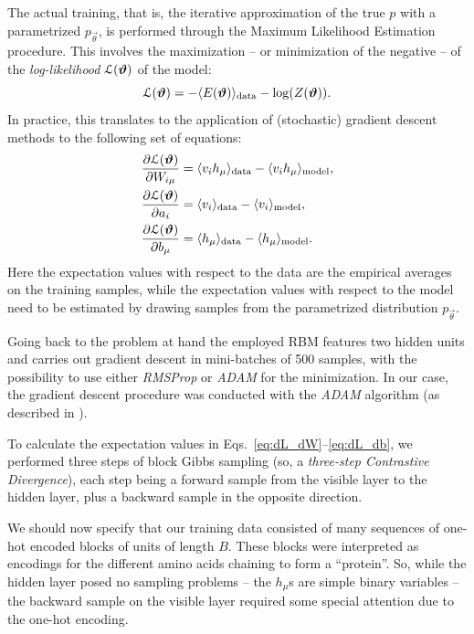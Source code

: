 \documentclass[prl, twocolumn]{revtex4-2}
\begin{document}
The actual training, that is, the iterative approximation of the true $p$
with a parametrized $p_{\vec{\theta}}$, is performed through the Maximum
Likelihood Estimation procedure. This involves the maximization – or
minimization of the negative – of the \emph{log-likelihood}
$\mathcal{L}(\bm{\vartheta})$ of the model:
\begin{equation}
    \mathcal{L}(\bm{\vartheta}) = -\langle E(\bm{\vartheta})\rangle_{\mathrm{data}} -
    \log(Z(\bm{\vartheta})).
\end{equation}
In practice, this translates to the application of (sto\-chas\-tic) gradient descent methods to the following set
of equations:
\begin{align}
    \pdiff{\logL(\vec{\theta})}{W_{i\mu}} &= \expval{v_i
    h_\mu}_{\mathrm{data}} - \expval{v_i h_\mu}_{\mathrm{model}},
    \label{eq:dL_dW} \\
    \pdiff{\logL(\vec{\theta})}{a_i} &= \expval{v_i}_{\mathrm{data}} -
    \expval{v_i}_{\mathrm{model}}, \label{eq:dL_da} \\
    \pdiff{\logL(\vec{\theta})}{b_\mu} &= \expval{h_\mu}_{\mathrm{data}} -
    \expval{h_\mu}_{\mathrm{model}}. \label{eq:dL_db}
\end{align}
Here the expectation values with respect to the data are the empirical
averages on the training samples, while the expectation values with respect
to the model need to be estimated by drawing samples from the parametrized
distribution $p_{\vec{\theta}}$.

Going back to the problem at hand the employed RBM features two hidden units and carries out gradient descent in mini-batches of 500 samples, with the possibility to use either \emph{RMSProp} or \emph{ADAM} for the minimization. In our case, the gradient descent procedure was conducted with the \emph{ADAM} algorithm (as described in
\cite{Mehta2019}). 

To calculate the expectation values in
Eqs.~\eqref{eq:dL_dW}–\eqref{eq:dL_db}, we performed three steps of block
Gibbs sampling (so, a \emph{three-step Contrastive Divergence}), each step
being a forward sample from the visible layer to the hidden layer, plus a
backward sample in the opposite direction.

We should now specify that our training data consisted of many sequences of
one-hot encoded blocks of units of length $B$. These blocks were interpreted as
encodings for the different amino acids chaining to form a “protein”. So,
while the hidden layer posed no sampling problems – the $h_\mu$s are
simple binary variables – the backward sample on the visible layer required
some special attention due to the one-hot encoding.
\end{document}
